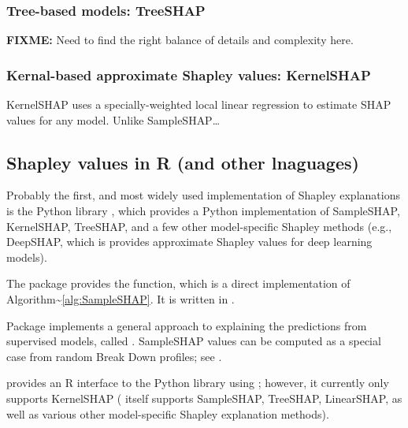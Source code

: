 \hypertarget{tree-based-models-treeshap}{%
\subsubsection{Tree-based models:
TreeSHAP}\label{tree-based-models-treeshap}}

\textbf{FIXME:} Need to find the right balance of details and complexity
here.

\hypertarget{kernal-based-approximate-shapley-values-kernelshap}{%
\subsubsection{Kernal-based approximate Shapley values:
KernelSHAP}\label{kernal-based-approximate-shapley-values-kernelshap}}

KernelSHAP \citep{lundberg-2017-KernelSHAP} uses a specially-weighted
local linear regression to estimate SHAP values for any model. Unlike
SampleSHAP\ldots{}

\hypertarget{shapley-values-in-r-and-other-lnaguages}{%
\subsection{Shapley values in R (and other
lnaguages)}\label{shapley-values-in-r-and-other-lnaguages}}

Probably the first, and most widely used implementation of Shapley
explanations is the Python  library
\citep{lundberg-2017-KernelSHAP}, which provides a Python implementation
of SampleSHAP, KernelSHAP, TreeSHAP, and a few other model-specific
Shapley methods (e.g., DeepSHAP, which is provides approximate Shapley
values for deep learning models).

The  package \citep{R-iml} provides the 
function, which is a direct implementation of
Algorithm\textasciitilde{}\ref{alg:SampleSHAP}. It is written in
 \citep{R-R6}.

Package  implements a general approach to explaining
the predictions from supervised models, called 
\citep{gosiewska-2019-iBreakDown}. SampleSHAP values can be computed as
a special case from random Break Down profiles; see
.

 provides an R interface to the Python 
library using  \citep{R-reticulate}; however, it
currently only supports KernelSHAP ( itself supports
SampleSHAP, TreeSHAP, LinearSHAP, as well as various other
model-specific Shapley explanation methods).

